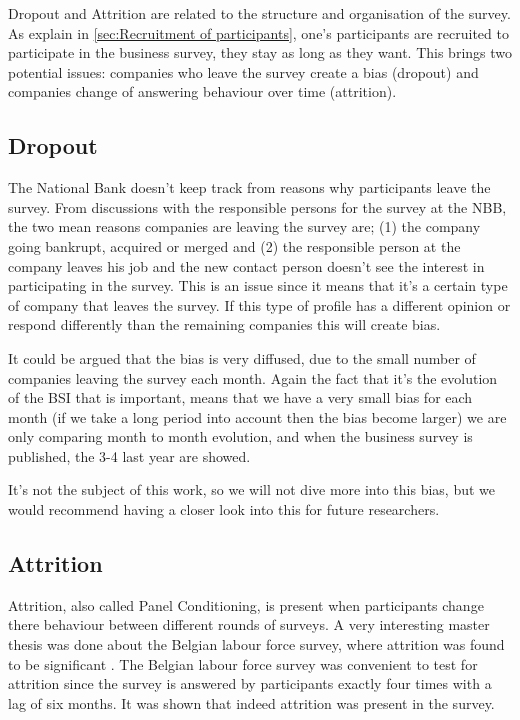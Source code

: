 \documentclass[12pt,a4paper,oneside]{book}
\begin{document}
Dropout and Attrition are related to the structure and organisation of the survey. 
As explain in \autoref{sec:Recruitment of participants}, one's participants are recruited to participate in the business survey, they stay as long as they want. This brings two potential issues: companies who leave the survey create a bias (dropout) and companies change of answering behaviour over time (attrition).

\subsection{Dropout}

The National Bank doesn't keep track from reasons why participants leave the survey. From discussions with the responsible persons for the survey at the NBB, the two mean reasons companies are leaving the survey are; (1) the company going bankrupt, acquired or merged and (2) the responsible person at the company leaves his job and the new contact person doesn't see the interest in participating in the survey.
This is an issue since it means that it's a certain type of company that leaves the survey. If this type of profile has a different opinion or respond differently than the remaining companies this will create bias. 


It could be argued that the bias is very diffused, due to the small number of companies leaving the survey each month. Again the fact that it's the evolution of the BSI that is important, means that we have a very small bias for each month (if we take a long period into account then the bias become larger) we are only comparing month to month evolution, and when the business survey is published, the 3-4 last year are showed.

It's not the subject of this work, so we will not dive more into this bias, but we would recommend having a closer look into this for future researchers.

\subsection{Attrition}

Attrition, also called Panel Conditioning, is present when participants change there behaviour between different rounds of surveys. 
A very interesting master thesis was done about the Belgian labour force survey, where attrition was found to be significant \cite{priyana_hardjawidjaksana_investigating_2019}.
The Belgian labour force survey was convenient to test for attrition since the survey is answered by participants exactly four times with a lag of six months.
It was shown that indeed attrition was present in the survey.
\end{document}
